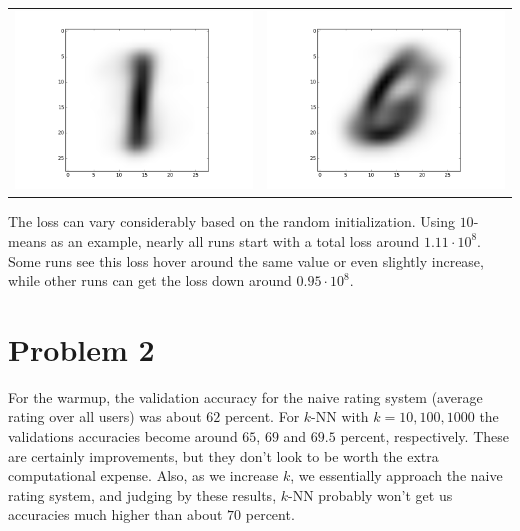 \documentclass[11pt]{article}
\begin{document}
\begin{tabular}{cc}
\includegraphics[scale=0.4]{images/10-images/8} & \includegraphics[scale=0.4]{images/10-images/9}
\end{tabular}\newpage
The loss can vary considerably based on the random initialization. Using $10$-means as an example, nearly all runs start with a total loss around $1.11\cdot10^8$. Some runs see this loss hover around the same value or even slightly increase, while other runs can get the loss down around $0.95\cdot10^8$.


\section*{Problem 2}

For the warmup, the validation accuracy for the naive rating system (average rating over all users) was about $62$ percent. For $k$-NN with $k=10,100,1000$ the validations accuracies become around $65$, $69$ and $69.5$ percent, respectively. These are certainly improvements, but they don't look to be worth the extra computational expense. Also, as we increase $k$, we essentially approach the naive rating system, and judging by these results, $k$-NN probably won't get us accuracies much higher than about $70$ percent.
\end{document}
